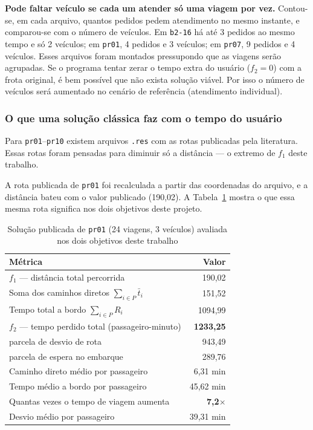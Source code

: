 \documentclass[12pt,a4paper]{article}
\theoremstyle{plain}
\begin{document}
\textbf{Pode faltar veículo se cada um atender só uma viagem por vez.} Contou-se, em cada arquivo, quantos pedidos pedem atendimento no mesmo instante, e comparou-se com o número de veículos. Em \texttt{b2-16} há até 3 pedidos ao mesmo tempo e só 2 veículos; em \texttt{pr01}, 4 pedidos e 3 veículos; em \texttt{pr07}, 9 pedidos e 4 veículos. Esses arquivos foram montados pressupondo que as viagens serão agrupadas. Se o programa tentar zerar o tempo extra do usuário ($f_2 = 0$) com a frota original, é bem possível que não exista solução viável. Por isso o número de veículos será aumentado no cenário de referência (atendimento individual).

\subsubsection{O que uma solução clássica faz com o tempo do usuário}
\label{sec:evidencia}

Para \texttt{pr01}--\texttt{pr10} existem arquivos \texttt{.res} com as rotas publicadas pela literatura. Essas rotas foram pensadas para diminuir só a distância --- o extremo de $f_1$ deste trabalho.

A rota publicada de \texttt{pr01} foi recalculada a partir das coordenadas do arquivo, e a distância bateu com o valor publicado (190,02). A Tabela~\ref{tab:pr01} mostra o que essa mesma rota significa nos dois objetivos deste projeto.

\begin{table}[htbp]
\centering
\caption{Solução publicada de \texttt{pr01} (24 viagens, 3 veículos) avaliada nos dois objetivos deste trabalho}
\label{tab:pr01}
\begin{tabular}{@{}lr@{}}
\toprule
\textbf{Métrica} & \textbf{Valor} \\
\midrule
$f_1$ --- distância total percorrida & 190,02 \\
Soma dos caminhos diretos $\sum_{i \in P} \bar{t}_i$ & 151,52 \\
Tempo total a bordo $\sum_{i \in P} R_i$ & 1094,99 \\
\midrule
$f_2$ --- tempo perdido total (passageiro-minuto) & \textbf{1233,25} \\
\quad parcela de desvio de rota & 943,49 \\
\quad parcela de espera no embarque & 289,76 \\
\midrule
Caminho direto médio por passageiro & 6,31 min \\
Tempo médio a bordo por passageiro & 45,62 min \\
Quantas vezes o tempo de viagem aumenta & \textbf{7,2$\times$} \\
Desvio médio por passageiro & 39,31 min \\
\bottomrule
\end{tabular}
\end{table}
\end{document}
